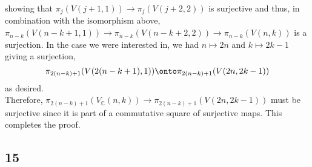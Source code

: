 \documentclass[12pt]{extarticle}
\newcommand{\C}{\mathbb{C}}
\begin{document}
\begin{center}
\end{center} 
showing that $\pi_j(V(j + 1, 1)) \to \pi_j(V(j + 2, 2))$ is surjective and thus, in combination with the isomorphism above, $\pi_{n-k}(V(n - k + 1, 1)) \to \pi_{n-k}(V(n - k + 2, 2)) \to \pi_{n - k}(V(n, k))$ is a surjection. In the case we were interested in, we had $n \mapsto 2n$ and $k \mapsto 2k - 1$ giving a surjection,
\[ \pi_{2(n - k) + 1}(V(2(n - k + 1), 1)) \onto \pi_{2(n - k) + 1}(V(2n, 2k - 1)) \]
as desired. 
\bigskip\\
Therefore, $\pi_{2(n-k) + 1}(V_\C(n, k)) \to \pi_{2(n-k) + 1}(V(2n, 2k - 1))$ must be surjective since it is part of a commutative square of surjective maps. This completes the proof.

\subsection{15}
\end{document}
